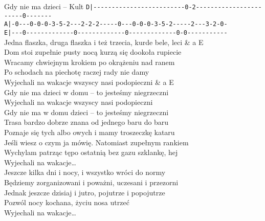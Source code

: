 \begin{piosenka}[-7mm]{Gdy nie ma dzieci -- Kult}
\small
\verb+D|-------------------------0-2-----------------------0-------+\\
\small
\verb+A|-0---0-0-0-3-5-2---2-2-2-----0---0-0-0-3-5-2-----2---3-2-0-+\\
\small
\verb+E|---0-------------0-------------0-------------0-0-----------+\\[5mm]

Jedna flaszka, druga flaszka i też trzecia, kurde bele, leci & a E \\
Dom stoi zupełnie pusty nocą kurzą się dookoła rupiecie \\
Wracamy chwiejnym krokiem po okrążeniu nad ranem \\
Po schodach na piechotę raczej rady nie damy \\ [\zwrotkaspace]

 Wyjechali na wakacje wszyscy nasi podopieczni & a E \\ 
 Gdy nie ma dzieci w domu -- to jesteśmy niegrzeczni  \\
 Wyjechali na wakacje wszyscy nasi podopieczni \\
 Gdy nie ma w domu dzieci -- to jesteśmy niegrzeczni \\ [\zwrotkaspace] 

Trasa bardzo dobrze znana od jednego baru do baru \\
Poznaje się tych albo owych i mamy troszeczkę kataru \\
Jeśli wiesz o czym ja mówię. Natomiast zupełnym rankiem \\ 
Wychylam patrząc tępo ostatnią bez gazu szklankę, hej \\[\zwrotkaspace]

 Wyjechali na wakacje\ldots \\ [\zwrotkaspace]

Jeszcze kilka dni i nocy, i wszystko wróci do normy \\ 
Będziemy zorganizowani i poważni, uczesani i przezorni \\ 
Jednak jeszcze dzisiaj i jutro, pojutrze i popojutrze \\
Pozwól nocy kochana, życiu nosa utrzeć \\[\zwrotkaspace]

 Wyjechali na wakacje\ldots \\ [\zwrotkaspace]

\end{piosenka}